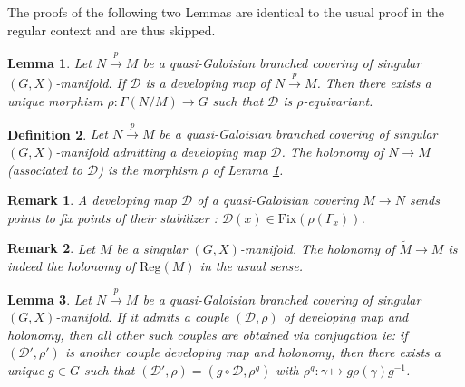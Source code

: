 \documentclass[a4paper,12pt]{article}
\newtheorem{lem}{Lemma}[section]          %
\newtheorem{defi}[lem]{Definition}    %
\newtheorem{rem}{Remark}             %
\def\D{\mathcal{D}}
\def\U{\mathcal U}
\def\V{\mathcal V}
\def\D{\mathcal{D}}
\def\Reg{\mathrm{Reg}}
\def\fix{\mathrm{Fix}}
\def\reg{\Reg}
\def\V{\mathcal V}
\def\reg{\mathrm{Reg}}
\def\D{\mathcal{D}}
\def\U{\mathcal{U}}
\def\fix{\mathrm{Fix}}
\def\Reg{\mathrm{Reg}}
\def\fix{\mathrm{Fix}}
\begin{document}
The proofs of the following two Lemmas are identical to the usual proof in the regular context and are thus skipped.  
\begin{lem} \label{lem:holonomy} Let $N\xrightarrow{p} M$ be a quasi-Galoisian branched covering of singular $(G,X)$-manifold. If $\D$  is a developing map of $N\xrightarrow{p} M$. 
Then there exists a unique morphism $\rho:\Gamma(N/M)\rightarrow G$ such that $\D$ is $\rho$-equivariant.
\end{lem}
\begin{defi}\label{def:quasi_galoisian_branched_covering_singular} 
 Let $N\xrightarrow{p} M$ be a quasi-Galoisian branched covering of singular $(G,X)$-manifold admitting a developing map $\D$. The holonomy of $N\rightarrow M$ (associated to $\D$) is the morphism $\rho$ of Lemma \ref{lem:holonomy}.
\end{defi}
 \begin{rem}\label{rem:developing_map_quasi_galoisian_covering}
    A developing map $\D$ of a quasi-Galoisian covering $M\rightarrow N$ sends points to fix points of their stabilizer : $\D(x) \in \fix(\rho(\Gamma_x))$.
  \end{rem}
  
\begin{rem}\label{rem:singular_manifold_holonomy_indeed} 
 Let $M$ be a singular $(G,X)$-manifold. The holonomy of $\widetilde M \rightarrow M$ is indeed the holonomy of $\reg(M)$ in the usual sense.
\end{rem}
\begin{lem}\label{lem:quasi_galoisian_branched_covering_singular}
 Let $N\xrightarrow{p} M$ be a quasi-Galoisian branched covering of singular $(G,X)$-manifold. If it admits a couple $(\D,\rho)$ of developing map and holonomy, then all other such couples are obtained via conjugation ie:
 if $(\D',\rho')$ is another couple developing map and holonomy, then there exists a unique $g\in G$ such that $(\D',\rho)= (g\circ\D,\rho^g)$ with $\rho^g : \gamma \mapsto g\rho(\gamma)g^{-1}$.
\end{lem}
\end{document}
